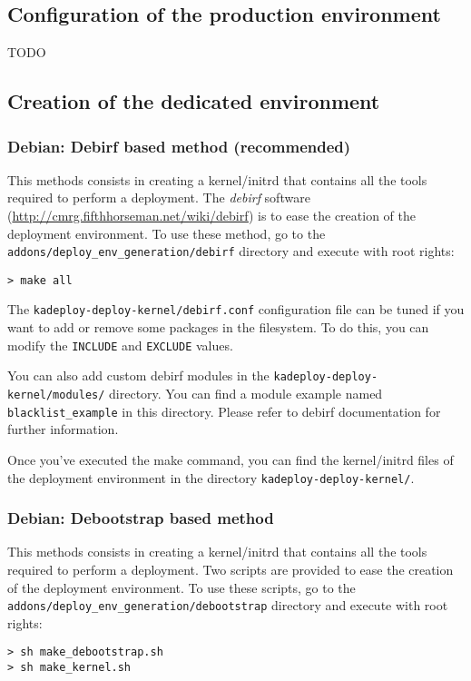 \documentclass[a4wide,10pt,oneside]{book}
\begin{document}
\subsection{Configuration of the production environment}
TODO
\subsection{Creation of the dedicated environment}
\subsubsection{Debian: Debirf based method (recommended)}
This methods consists in creating a kernel/initrd that contains all the tools required to perform a deployment. The \emph{debirf} software (\url{http://cmrg.fifthhorseman.net/wiki/debirf}) is to ease the creation of the deployment environment. To use these method, go to the \texttt{addons/deploy\_env\_generation/debirf} directory and execute with root rights:
\begin{small}
\begin{verbatim}
> make all
\end{verbatim}
\end{small}

The \texttt{kadeploy-deploy-kernel/debirf.conf} configuration file can be tuned if you want to add or remove some packages in the filesystem. To do this, you can modify the \texttt{INCLUDE} and \texttt{EXCLUDE} values.

You can also add custom debirf modules in the \texttt{kadeploy-deploy-kernel/modules/} directory. You can find a module example named \texttt{blacklist\_example} in this directory. Please refer to debirf documentation for further information.

Once you've executed the make command, you can find the kernel/initrd files of the deployment environment in the directory \texttt{kadeploy-deploy-kernel/}.

\subsubsection{Debian: Debootstrap based method}
This methods consists in creating a kernel/initrd that contains all the tools required to perform a deployment. Two scripts are provided to ease the creation of the deployment environment. To use these scripts, go to the \texttt{addons/deploy\_env\_generation/debootstrap} directory and execute with root rights:
\begin{small}
\begin{verbatim}
> sh make_debootstrap.sh
> sh make_kernel.sh
\end{verbatim}
\end{small}
\end{document}
